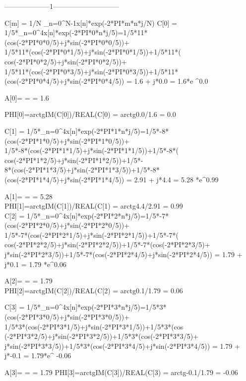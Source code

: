 \documentclass[landscape, 12pt]{report}
\begin{document}
\pagestyle{plain}
\pagecolor{white}




\begin{center}
--------------------1-----------------------------
\end{center}

C[m] = 1/N \sum_{n=0}^{N-1}{x[n]*exp(-2*PI*m*n*j/N)}
C[0] = 1/5*\sum_{n=0}^{4}{x[n]*exp(-2*PI*0*n*j/5)}=1/5*11*(cos(-2*PI*0*0/5)+j*sin(-2*PI*0*0/5))+\\1/5*11*(cos(-2*PI*0*1/5)+j*sin(-2*PI*0*1/5))+1/5*11*(
cos(-2*PI*0*2/5)+j*sin(-2*PI*0*2/5))+\\1/5*11*(cos(-2*PI*0*3/5)+j*sin(-2*PI*0*3/5))+1/5*11*(cos(-2*PI*0*4/5)+j*sin(-2*PI*0*4/5)) = 1.6 + j*0.0 = 1.6*e
^{0.0}\par
A[0]=\sqrt{REAL(C[0])^2+IM(C[0)^2} =  = 1.6\par
PHI[0]=arctg{IM(C[0])/REAL(C[0)} = arctg{0.0/1.6} = 0.0\par

C[1] = 1/5*\sum_{n=0}^{4}{x[n]*exp(-2*PI*1*n*j/5)}=1/5*-8*(cos(-2*PI*1*0/5)+j*sin(-2*PI*1*0/5))+\\1/5*-8*(cos(-2*PI*1*1/5)+j*sin(-2*PI*1*1/5))+1/5*-8*(
cos(-2*PI*1*2/5)+j*sin(-2*PI*1*2/5))+1/5*-\\8*(cos(-2*PI*1*3/5)+j*sin(-2*PI*1*3/5))+1/5*-8*(cos(-2*PI*1*4/5)+j*sin(-2*PI*1*4/5)) = 2.91 + j*4.4 = 5.28
*e^{0.99}\par
A[1]=\sqrt{REAL(C[1])^2+IM(C[1)^2} =  = 5.28\\
PHI[1]=arctg{IM(C[1])/REAL(C[1)} = arctg{4.4/2.91} = 0.99\\

C[2] = 1/5*\sum_{n=0}^{4}{x[n]*exp(-2*PI*2*n*j/5)}=1/5*-7*(cos(-2*PI*2*0/5)+j*sin(-2*PI*2*0/5))+\\1/5*-7*(cos(-2*PI*2*1/5)+j*sin(-2*PI*2*1/5))+1/5*-7*(
cos(-2*PI*2*2/5)+j*sin(-2*PI*2*2/5))+1/5*-7*(cos(-2*PI*2*3/5)+\\j*sin(-2*PI*2*3/5))+1/5*-7*(cos(-2*PI*2*4/5)+j*sin(-2*PI*2*4/5)) = 1.79 + j*0.1 = 1.79
*e^{0.06}\par
A[2]=\sqrt{REAL(C[2])^2+IM(C[2)^2} =  = 1.79\\
PHI[2]=arctg{IM(C[2])/REAL(C[2)} = arctg{0.1/1.79} = 0.06\par

C[3] = 1/5*\sum_{n=0}^{4}{x[n]*exp(-2*PI*3*n*j/5)}=1/5*3*(cos(-2*PI*3*0/5)+j*sin(-2*PI*3*0/5))+\\1/5*3*(cos(-2*PI*3*1/5)+j*sin(-2*PI*3*1/5))+1/5*3*(cos
(-2*PI*3*2/5)+j*sin(-2*PI*3*2/5))+1/5*3*(cos(-2*PI*3*3/5)+\\j*sin(-2*PI*3*3/5))+1/5*3*(cos(-2*PI*3*4/5)+j*sin(-2*PI*3*4/5)) = 1.79 + j*-0.1 = 1.79*e^{
-0.06}\par
A[3]=\sqrt{REAL(C[3])^2+IM(C[3)^2} =  = 1.79
PHI[3]=arctg{IM(C[3])/REAL(C[3)} = arctg{-0.1/1.79} = -0.06
\end{document}
